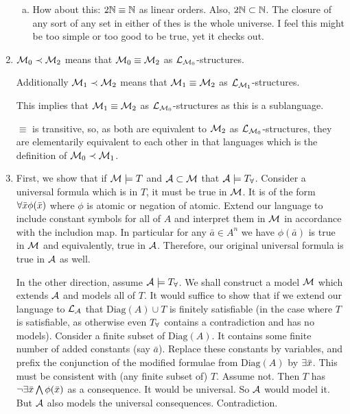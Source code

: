 \begin{enumerate}[1.]
\begin{enumerate}[a)]
  \item How about this: \(2\mathbb{N} \equiv \mathbb{N}\) as linear orders. Also, \(2\mathbb{N} \subset \mathbb{N}\). The closure of any sort of any set in either of thes is the whole universe. I feel this might be too simple or too good to be true, yet it checks out. 

\end{enumerate}

\item \(\mathcal{M}_0 \prec \mathcal{M}_2\) means that \(\mathcal{M}_0 \equiv \mathcal{M}_2\) as \(\mathcal{L}_{\mathcal{M}_0}\)-structures. 

Additionally \(\mathcal{M}_1 \prec \mathcal{M}_2\) means that \(\mathcal{M}_1 \equiv \mathcal{M}_2\) as \(\mathcal{L}_{\mathcal{M}_1}\)-structures. 

This implies that \(\mathcal{M}_1 \equiv \mathcal{M}_2\) as \(\mathcal{L}_{\mathcal{M}_0}\)-structures as this is a sublanguage. 

\(\equiv\) is transitive, so, as both are equivalent to \(\mathcal{M}_2\) as \(\mathcal{L}_{\mathcal{M}_0}\)-structures, they are elementarily equivalent to each other in that languages which is the definition of \(\mathcal{M}_0 \prec \mathcal{M}_1\). 
 

\item First, we show that if \(\mathcal{M} \models T\) and \(\mathcal{A} \subset \mathcal{M}\) that \(\mathcal{A} \models T_\forall\). Consider a universal formula which is in \(T\), it must be true in \(\mathcal{M}\). It is of the form \(\forall\bar{x}\phi(\bar{x})\) where \(\phi\) is atomic or negation of atomic. Extend our language to include constant symbols for all of \(A\) and interpret them in \(\mathcal{M}\) in accordance with the includion map. In particular for any \(\bar{a} \in A^n\) we have \(\phi(\bar{a})\) is true in \(\mathcal{M}\) and equivalently, true in \(\mathcal{A}\). Therefore, our original universal formula is true in \(\mathcal{A}\) as well. 

In the other direction, assume \(\mathcal{A} \models T_\forall\). We shall construct a model \(\mathcal{M}\) which extends \(\mathcal{A}\) and models all of \(T\). It would suffice to show that if we extend our language to \(\mathcal{L}_{\mathcal{A}}\) that \(\text{Diag}(A) \cup T\) is finitely satisfiable (in the case where \(T\) is satisfiable, as otherwise even \(T_\forall\) contains a contradiction and has no models). Consider a finite subset of \(\text{Diag}(A)\). It contains some finite number of added constants (say \(\bar{a}\)). Replace these constants by variables, and prefix the conjunction of the modified formulae from \(\text{Diag}(A)\) by \(\exists\bar{x}\). This must be consistent with (any finite subset of) \(T\). Assume not. Then \(T\) has \(\neg\exists\bar{x}\bigwedge \phi(\bar{x})\) as a consequence. It would be universal. So \(\mathcal{A}\) would model it. But \(\mathcal{A}\) also models the universal consequences. Contradiction.   


\end{enumerate}
